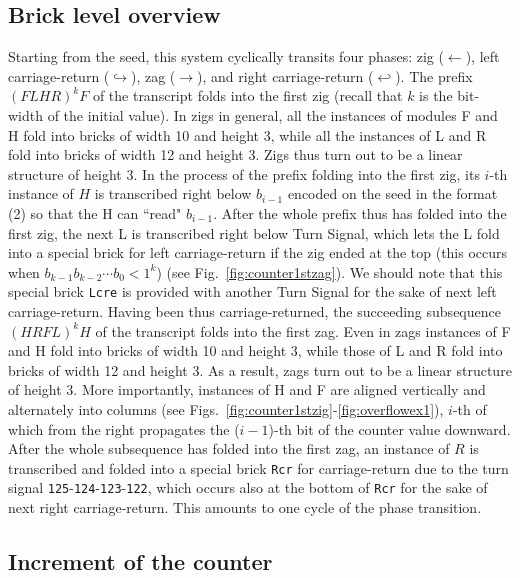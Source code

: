 \documentclass[runningheads]{llncs}
\begin{document}
\subsection{Brick level overview}
Starting from the seed, this system cyclically transits four phases: zig ($\leftarrow$), left carriage-return ($\hookrightarrow$), zag ($\rightarrow$), and right carriage-return ($\hookleftarrow$). 
The prefix $(FLHR)^k F$ of the transcript folds into the first zig (recall that $k$ is the bit-width of the initial value). 
In zigs in general, all the instances of modules F and H fold into bricks of width 10 and height 3, while all the instances of  L and R fold into bricks of width 12 and height 3. 
Zigs thus turn out to be a linear structure of height 3. 
In the process of the prefix folding into the first zig, its $i$-th instance of $H$ is transcribed right below $b_{i-1}$ encoded on the seed in the format (2) so that the H can ``read" $b_{i-1}$. 
After the whole prefix thus has folded into the first zig, the next L is transcribed right below Turn Signal, which lets the L fold into a special brick for left carriage-return if the zig ended at the top (this occurs when $b_{k-1} b_{k-2} \cdots b_0 < 1^k$) (see Fig.~\ref{fig:counter1stzag}). 
We should note that this special brick \texttt{Lcre} is provided with another Turn Signal for the sake of next left carriage-return.
Having been thus carriage-returned, the succeeding subsequence $(HRFL)^k H$ of the transcript folds into the first zag.
Even in zags instances of F and H fold into bricks of width 10 and height 3, while those of L and R fold into bricks of width 12 and height 3. 
As a result, zags turn out to be a linear structure of height 3. 
More importantly, instances of H and F are aligned vertically and alternately into columns (see Figs.~\ref{fig:counter1stzig}-\ref{fig:overflowex1}), $i$-th of which from the right propagates the ($i{-}1$)-th bit of the counter value downward. 
After the whole subsequence has folded into the first zag, an instance of $R$ is transcribed and folded into a special brick \texttt{Rcr} for carriage-return due to the turn signal \texttt{125}-\texttt{124}-\texttt{123}-\texttt{122}, which occurs also at the bottom of \texttt{Rcr} for the sake of next right carriage-return. 
This amounts to one cycle of the phase transition.

\subsection{Increment of the counter}
\end{document}
